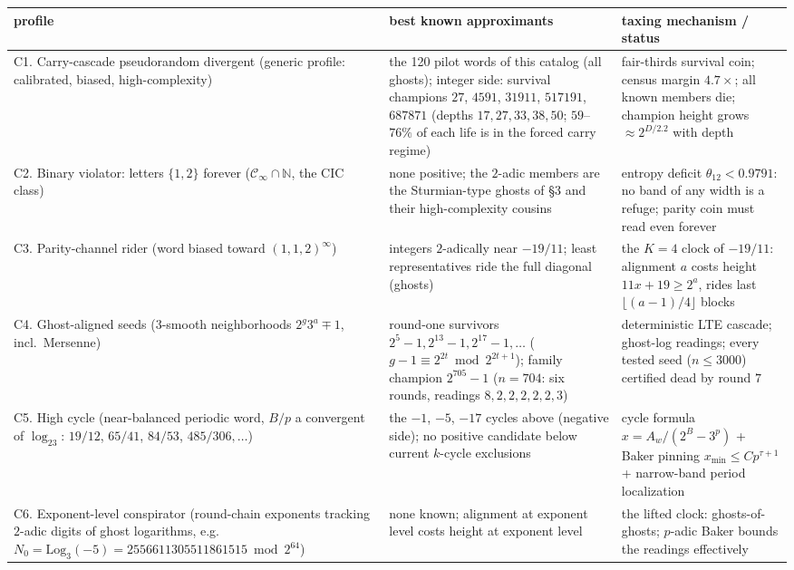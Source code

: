 \documentclass[10pt]{article}
\begin{document}
\begin{center}
\begin{tabular}{p{4.1cm}p{4.6cm}p{5.6cm}}
\toprule
profile & best known approximants & taxing mechanism / status\\
\midrule
C1. Carry-cascade pseudorandom divergent (generic profile: calibrated,
biased, high-complexity) &
the 120 pilot words of this catalog (all ghosts); integer
side: survival champions $27$, $4591$, $31911$, $517191$, $687871$
(depths $17,27,33,38,50$; $59$--$76\%$ of each life is in the forced
carry regime) &
fair-thirds survival coin; census margin $4.7\times$; all known
members die; champion height grows $\approx2^{D/2.2}$ with depth\\
\addlinespace
C2. Binary violator: letters $\{1,2\}$ forever ($\mathcal C_\infty\cap
\mathbb N$, the CIC class) &
none positive; the $2$-adic members are the Sturmian-type ghosts of
\S3 and their high-complexity cousins &
entropy deficit $\theta_{12}<0.9791$: no band of any width is a
refuge; parity coin must read even forever\\
\addlinespace
C3. Parity-channel rider (word biased toward $(1,1,2)^\infty$) &
integers $2$-adically near $-19/11$; least representatives ride the
full diagonal (ghosts) &
the $K{=}4$ clock of $-19/11$: alignment $a$ costs height
$11x+19\ge2^a$, rides last $\lfloor(a-1)/4\rfloor$ blocks\\
\addlinespace
C4. Ghost-aligned seeds ($3$-smooth neighborhoods $2^g3^a\mp1$, incl.\
Mersenne) &
round-one survivors $2^5{-}1,2^{13}{-}1,2^{17}{-}1,\dots$
($g-1\equiv2^{2t}\bmod2^{2t+1}$); family champion $2^{705}-1$
($n=704$: six rounds, readings $8,2,2,2,2,2,3$) &
deterministic LTE cascade; ghost-log readings; every tested seed
($n\le3000$) certified dead by round $7$\\
\addlinespace
C5. High cycle (near-balanced periodic word, $B/p$ a convergent of
$\log_23$: $19/12$, $65/41$, $84/53$, $485/306,\dots$) &
the $-1$, $-5$, $-17$ cycles above (negative side); no positive
candidate below current $k$-cycle exclusions &
cycle formula $x=A_w/(2^B-3^p)$ + Baker pinning
$x_{\min}\le Cp^{\tau+1}$ + narrow-band period localization\\
\addlinespace
C6. Exponent-level conspirator (round-chain exponents tracking
$2$-adic digits of ghost logarithms, e.g.\
$N_0=\mathrm{Log}_3(-5)=2556611305511861515\bmod2^{64}$) &
none known; alignment at exponent level costs height at exponent
level &
the lifted clock: ghosts-of-ghosts; $p$-adic Baker bounds the
readings effectively\\
\bottomrule
\end{tabular}
\end{center}
\end{document}
